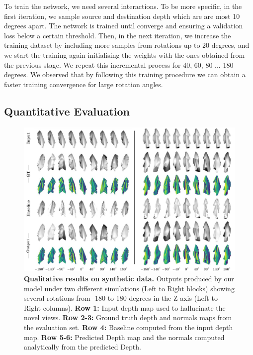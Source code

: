 To train the network, we need several interactions. To be more specific, in the first iteration, we sample source and destination depth which are are most 10 degrees apart.  The network is trained until converge and ensuring a validation loss below a certain threshold.  Then, in the next iteration, we increase the training dataset by including more samples from rotations up to 20 degrees, and we start the training again initialising the weights with the ones obtained from the previous stage. We repeat this incremental process for 40, 60, 80 ... 180 degrees. We observed that by following this training procedure we can obtain a faster training convergence for large rotation angles.   

\subsection{Quantitative Evaluation}

\begin{figure}
\begin{center}
    \includegraphics[width=\linewidth]{main/chapter04/data/ipalm_cvpr_grid_synth_vertical.pdf}
    \caption[Qualitative results on synthetic data]{{\bf Qualitative results on synthetic data.} Outputs produced by our model under two different simulations (Left to Right blocks) showing several rotations from -180 to 180 degrees in the Z-axis (Left to Right columns). \textbf{Row 1:} Input depth map used to hallucinate the novel views. \textbf{Row 2-3:} Ground truth depth and normals maps from the evaluation set. \textbf{Row 4:} Baseline computed from the input depth map. \textbf{Row 5-6:} Predicted Depth map and the normals computed analytically from the predicted Depth.}
    \label{fig_outputs_synthetic}
\end{center}
\end{figure}

